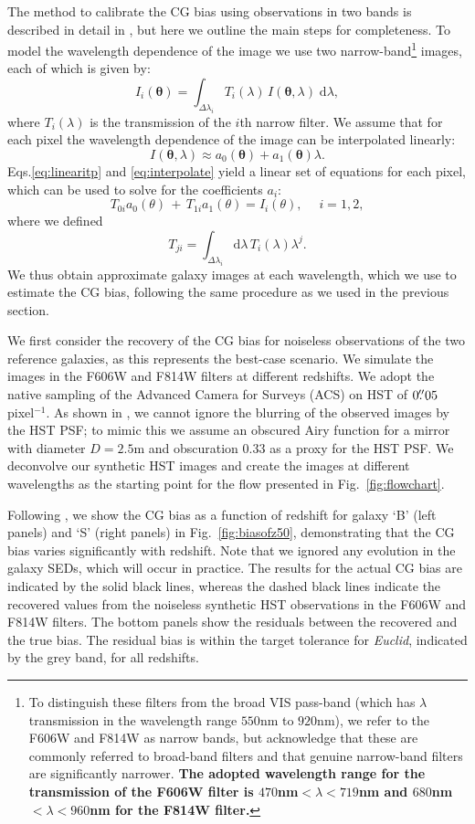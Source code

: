 \documentclass[useAMS,usenatbib]{mnras}
\renewcommand{\d}{\mathrm{d}}
\newcommand{\be}{\begin{equation}}
\newcommand{\ee}{\end{equation}}
\def\elabel#1{\label{eq:#1}}
\begin{document}
The method to calibrate the CG bias using observations in two bands is described in detail in , but here we outline the main steps for completeness. To model the wavelength dependence of the image we use two narrow-band\footnote{To distinguish these filters from the broad VIS pass-band (which has $\lambda$ transmission in the wavelength range $550$nm to $920$nm), we refer to the F606W and F814W as narrow bands, but acknowledge that these are commonly referred to broad-band filters and that genuine narrow-band filters are significantly narrower. {\bf The adopted wavelength range for the transmission of the F606W filter is $470$nm$<\lambda<719$nm and $680$nm$<\lambda<960$nm for the F814W filter.} } images, each of which is given by:
%
\be
I_i({\bm\theta}) = \int_{\Delta \lambda_i} T_i(\lambda)\, I({\bm \theta},\lambda) \;\d \lambda,
\elabel{linearitp}
\ee
%
where $T_i(\lambda)$ is the transmission of the $i$th narrow filter. We assume that for each pixel the wavelength dependence of the image can be interpolated linearly:
%
\be
I({\bm \theta},\lambda) \approx  a_0({\bm \theta})+a_1({\bm \theta})\lambda.
\elabel{interpolate}
\ee
%
Eqs.\ref{eq:linearitp} and \ref{eq:interpolate} yield a linear set of
equations for each pixel, which can be used to solve for the
coefficients $a_i$:
%
\be
T_{0i} a_0(\theta) \,+\,T_{1i} a_1(\theta) = I_i(\theta), \quad\; i=1,2,
\elabel{lineareq}
\ee
%
where we defined
\be
T_{ji}=\int_{\Delta\lambda_i} \d \lambda\,T_i(\lambda)\lambda^j.
\ee
%
We thus obtain approximate galaxy images at each wavelength, which we use to estimate the CG bias, following the same procedure as we used in the previous section.

We first consider the recovery of the CG bias for noiseless observations of the two reference galaxies, as this represents the best-case scenario. We simulate the images in the F606W and F814W filters at different redshifts. We adopt the native sampling of the Advanced Camera for Surveys (ACS) on HST of  $0\hbox{$.\!\!^{\prime\prime}$}05$ pixel$^{-1}$. As shown in , we cannot ignore the blurring of the observed images by the HST PSF; to mimic this we assume an obscured Airy function for a mirror with diameter $D=2.5$m and obscuration  $0.33$ as a proxy for the HST PSF. We deconvolve our synthetic HST images and create the images at different wavelengths as the starting point for the flow presented in Fig.~\ref{fig:flowchart}.
{\bf }


Following , we show  the CG bias as a function of redshift for galaxy `B' (left panels) and `S' (right panels) in Fig.~\ref{fig:biasofz50}, demonstrating that the CG bias varies significantly with redshift. Note that we ignored any evolution in the galaxy SEDs, which will occur in practice. The results for the actual CG bias are indicated by the solid black lines, whereas the dashed black lines indicate the recovered values from the noiseless synthetic HST observations in the F606W and F814W filters.  The bottom panels show the residuals between the recovered and the true bias. The residual bias is within the target tolerance for {\it Euclid}, indicated by the grey band, for all redshifts.
\end{document}

